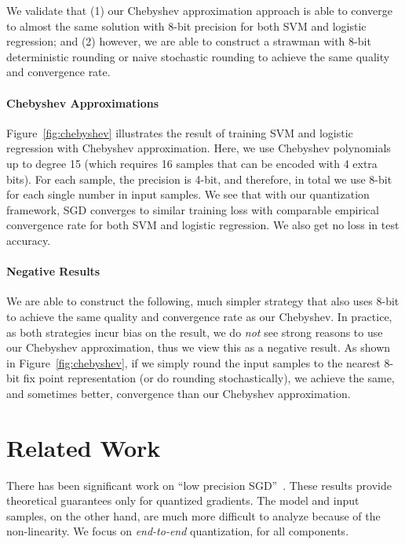 \documentclass{article}
\begin{document}
We validate that (1) our Chebyshev 
approximation approach is able to
converge to almost the same solution 
with 8-bit precision for both SVM
and logistic regression;
and (2) however, we are able to construct
a strawman with 8-bit deterministic 
rounding or naive stochastic rounding
to achieve the same quality and convergence 
rate.

\vspace{-1em}
\paragraph{Chebyshev Approximations}

Figure~\ref{fig:chebyshev} illustrates
the result of training SVM
and logistic regression 
with Chebyshev approximation. Here,
we use Chebyshev polynomials up to
degree 15 (which requires 16 samples
that can be encoded with 4 extra 
bits). For each sample, the precision
is 4-bit, and therefore, in total
we use 8-bit for each single number
in input samples. We see that 
with our quantization framework,
SGD converges to similar training loss 
with comparable empirical convergence 
rate for both SVM and logistic regression.
We also get no loss in test accuracy.



\vspace{-1em}
\paragraph{Negative Results}

We are able to construct the following,
much simpler strategy that also
uses 8-bit to achieve the same quality
and convergence rate as our
Chebyshev. In practice, as both
strategies incur bias on the result,
we do {\em not} see strong reasons to
use our Chebyshev approximation, thus
we view this as a negative result.
As shown in Figure~\ref{fig:chebyshev},
if we simply round the input samples
to the nearest 8-bit fix point
representation (or do rounding
stochastically), we achieve the
same, and sometimes better,
convergence than our Chebyshev 
approximation.

\vspace{-1em}
\section{Related Work} 
\vspace{-1em}

There has been significant work on ``low precision SGD''~\cite{DeSa:NIPS:2015,Alistarh:2016:ArXiv}. 
These results provide
theoretical guarantees only for quantized gradients.
The model and input samples, on the other hand, are much more difficult
to analyze because of the non-linearity. We focus on {\em end-to-end}
quantization, for all  components.
\end{document}
